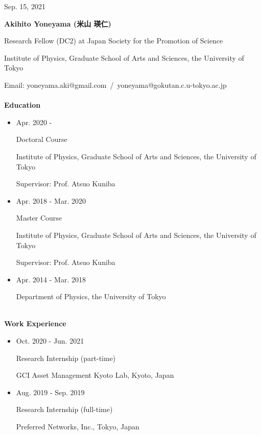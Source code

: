 \documentclass[dvipdfmx]{jsarticle}
\begin{document}
%
%
%
%
\begin{flushright}
Sep. 15, 2021
\end{flushright}
%
%
%
%
{\bf\Large Akihito Yoneyama (米山 瑛仁)}
\vspace{3mm}
\par
Research Fellow (DC2) at Japan Society for the Promotion of Science
\par
Institute of Physics, Graduate School of Arts and Sciences, the University of Tokyo
\par
Email: yoneyama.aki@gmail.com{\ }/{\ }yoneyama@gokutan.c.u-tokyo.ac.jp
%
%
%
%
{\ }\\\\
\vspace{3mm}
{\bf\large Education}
\vspace{-6mm}
\\\hrulefill
\begin{itemize}
\item
Apr. 2020 - 
\par
Doctoral Course
\par
Institute of Physics, Graduate School of Arts and Sciences, the University of Tokyo
\par
Supervisor: Prof. Atsuo Kuniba
\item
Apr. 2018 - Mar. 2020
\par
Master Course
\par
Institute of Physics, Graduate School of Arts and Sciences, the University of Tokyo
\par
Supervisor: Prof. Atsuo Kuniba
\item
Apr. 2014 - Mar. 2018
\par
Department of Physics, the University of Tokyo
\end{itemize}
%
%
%
%
{\ }\\
\vspace{3mm}
{\bf\large Work Experience}
\vspace{-6mm}
\\\hrulefill
\begin{itemize}
\item
Oct. 2020 - Jun. 2021
\par
Research Internship (part-time)
\par
GCI Asset Management Kyoto Lab, Kyoto, Japan
%
%
\item
Aug. 2019 - Sep. 2019
\par
Research Internship (full-time)
\par
Preferred Networks, Inc., Tokyo, Japan
\end{itemize}
\end{document}

